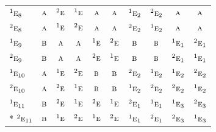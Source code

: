 \documentclass[10pt,a4paper]{article}
\numberwithin{equation}{section}
\newcommand{\irr}[1]{\text{\normalfont\scshape #1}}
\newcommand{\conjpair}[1]{{}^{#1}}
\begin{document}
{\begin{longtable}{@{}lccccccccc@{}}
$\conjpair{1}\irr{e}_{8}$ & $\irr{a}$ & $\conjpair{2}\irr{e}$ & $\conjpair{1}\irr{e}$ & $\irr{a}$ & $\irr{a}$ & $\conjpair{1}\irr{e}_{2}$ & $\conjpair{2}\irr{e}_{2}$ & $\irr{a}$ & $\irr{a}$\\
$\conjpair{2}\irr{e}_{8}$ & $\irr{a}$ & $\conjpair{1}\irr{e}$ & $\conjpair{2}\irr{e}$ & $\irr{a}$ & $\irr{a}$ & $\conjpair{2}\irr{e}_{2}$ & $\conjpair{1}\irr{e}_{2}$ & $\irr{a}$ & $\irr{a}$\\
$\conjpair{1}\irr{e}_{9}$ & $\irr{b}$ & $\irr{a}$ & $\irr{a}$ & $\conjpair{1}\irr{e}$ & $\conjpair{2}\irr{e}$ & $\irr{b}$ & $\irr{b}$ & $\conjpair{1}\irr{e}_{1}$ & $\conjpair{2}\irr{e}_{1}$\\
$\conjpair{2}\irr{e}_{9}$ & $\irr{b}$ & $\irr{a}$ & $\irr{a}$ & $\conjpair{2}\irr{e}$ & $\conjpair{1}\irr{e}$ & $\irr{b}$ & $\irr{b}$ & $\conjpair{2}\irr{e}_{1}$ & $\conjpair{1}\irr{e}_{1}$\\
$\conjpair{1}\irr{e}_{10}$ & $\irr{a}$ & $\conjpair{1}\irr{e}$ & $\conjpair{2}\irr{e}$ & $\irr{b}$ & $\irr{b}$ & $\conjpair{2}\irr{e}_{2}$ & $\conjpair{1}\irr{e}_{2}$ & $\conjpair{1}\irr{e}_{2}$ & $\conjpair{2}\irr{e}_{2}$\\
$\conjpair{2}\irr{e}_{10}$ & $\irr{a}$ & $\conjpair{2}\irr{e}$ & $\conjpair{1}\irr{e}$ & $\irr{b}$ & $\irr{b}$ & $\conjpair{1}\irr{e}_{2}$ & $\conjpair{2}\irr{e}_{2}$ & $\conjpair{2}\irr{e}_{2}$ & $\conjpair{1}\irr{e}_{2}$\\
$\conjpair{1}\irr{e}_{11}$ & $\irr{b}$ & $\conjpair{2}\irr{e}$ & $\conjpair{1}\irr{e}$ & $\conjpair{2}\irr{e}$ & $\conjpair{1}\irr{e}$ & $\conjpair{2}\irr{e}_{1}$ & $\conjpair{1}\irr{e}_{1}$ & $\conjpair{1}\irr{e}_{3}$ & $\conjpair{2}\irr{e}_{3}$\\*
$\conjpair{2}\irr{e}_{11}$ & $\irr{b}$ & $\conjpair{1}\irr{e}$ & $\conjpair{2}\irr{e}$ & $\conjpair{1}\irr{e}$ & $\conjpair{2}\irr{e}$ & $\conjpair{1}\irr{e}_{1}$ & $\conjpair{2}\irr{e}_{1}$ & $\conjpair{2}\irr{e}_{3}$ & $\conjpair{1}\irr{e}_{3}$\\
\bottomrule\end{longtable}}
\end{document}
